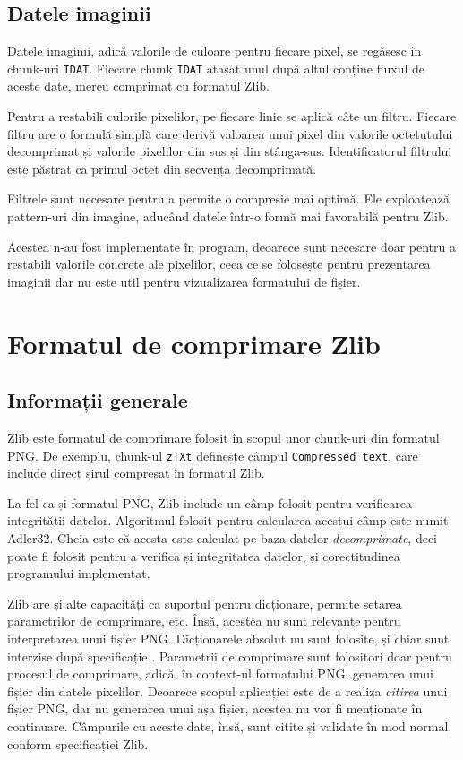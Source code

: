 \documentclass[a4paper,12pt]{report}
\begin{document}
\subsection{Datele imaginii}

Datele imaginii, adică valorile de culoare pentru fiecare pixel, se regăsesc în chunk-uri \texttt{IDAT}\cite[4.1.3.]{png_spec}.
Fiecare chunk \texttt{IDAT} atașat unul după altul conține fluxul de aceste date, mereu comprimat cu formatul Zlib.

Pentru a restabili culorile pixelilor, pe fiecare linie se aplică câte un filtru.
Fiecare filtru are o formulă simplă care derivă valoarea unui pixel
din valorile octetutului decomprimat și valorile pixelilor din sus și din stânga-sus.
Identificatorul filtrului este păstrat ca primul octet din secvența decomprimată. 

Filtrele sunt necesare pentru a permite o compresie mai optimă.
Ele exploatează pattern-uri din imagine, aducând datele într-o formă mai favorabilă pentru Zlib.

Acestea n-au fost implementate în program, deoarece sunt necesare
doar pentru a restabili valorile concrete ale pixelilor,
ceea ce se folosește pentru prezentarea imaginii dar nu este util pentru vizualizarea formatului de fișier.

\section{Formatul de comprimare Zlib}

\subsection{Informații generale}

Zlib este formatul de comprimare folosit în scopul unor chunk-uri din formatul \ac{PNG}.
De exemplu, chunk-ul \texttt{zTXt} definește câmpul \texttt{Compressed text},
care include direct șirul compresat în formatul Zlib\cite[4.1.3.]{zlib_spec}.

La fel ca și formatul \ac{PNG}, Zlib include un câmp folosit pentru verificarea integrității datelor.
Algoritmul folosit pentru calcularea acestui câmp este numit Adler32.
Cheia este că acesta este calculat pe baza datelor \textit{decomprimate},
deci poate fi folosit pentru a verifica și integritatea datelor, și corectitudinea programului implementat.

Zlib are și alte capacități ca suportul pentru dicționare, permite setarea parametrilor de comprimare, etc.
Însă, acestea nu sunt relevante pentru interpretarea unui fișier \ac{PNG}.
Dicționarele absolut nu sunt folosite, și chiar sunt interzise după specificație \cite[5.]{png_spec}.
Parametrii de comprimare sunt folositori doar pentru procesul de comprimare,
adică, în context-ul formatului \ac{PNG}, generarea unui fișier din datele pixelilor.
Deoarece scopul aplicației este de a realiza \textit{citirea} unui fișier \ac{PNG},
dar nu generarea unui așa fișier, acestea nu vor fi menționate în continuare.
Câmpurile cu aceste date, însă, sunt citite și validate în mod normal, conform specificației Zlib.
\end{document}
